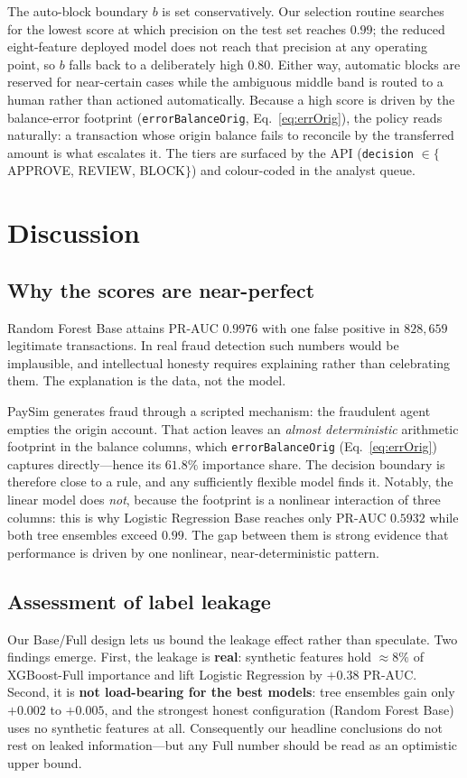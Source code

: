 \documentclass{article}
\begin{document}
The auto-block boundary $b$ is set conservatively. Our selection routine searches
for the lowest score at which precision on the test set reaches $0.99$; the
reduced eight-feature deployed model does not reach that precision at any operating
point, so $b$ falls back to a deliberately high $0.80$. Either way, automatic blocks
are reserved for near-certain cases while the ambiguous middle band is routed to a
human rather than actioned automatically. Because a high score is driven by the
balance-error footprint (\texttt{errorBalanceOrig},
Eq.~\ref{eq:errOrig}), the policy reads naturally: a transaction whose origin
balance fails to reconcile by the transferred amount is what escalates it. The
tiers are surfaced by the API
(\texttt{decision} $\in \{$APPROVE, REVIEW, BLOCK$\}$) and colour-coded in the
analyst queue.

\section{Discussion}
\label{sec:discussion}

\subsection{Why the scores are near-perfect}
Random Forest Base attains PR-AUC $0.9976$ with one false positive in
$828{,}659$ legitimate transactions. In real fraud detection such
numbers would be implausible, and intellectual honesty requires
explaining rather than celebrating them. The explanation is the data,
not the model.

PaySim generates fraud through a scripted mechanism: the fraudulent
agent empties the origin account. That action leaves an
\emph{almost deterministic} arithmetic footprint in the balance
columns, which \texttt{errorBalanceOrig} (Eq.~\ref{eq:errOrig})
captures directly---hence its $61.8\%$ importance share. The decision
boundary is therefore close to a rule, and any sufficiently flexible
model finds it. Notably, the linear model does \emph{not}, because the
footprint is a nonlinear interaction of three columns: this is why
Logistic Regression Base reaches only PR-AUC $0.5932$ while both tree
ensembles exceed $0.99$. The gap between them is strong evidence that
performance is driven by one nonlinear, near-deterministic pattern.

\subsection{Assessment of label leakage}
Our Base/Full design lets us bound the leakage effect rather than
speculate. Two findings emerge. First, the leakage is \textbf{real}:
synthetic features hold $\approx 8\%$ of XGBoost-Full importance and
lift Logistic Regression by $+0.38$ PR-AUC. Second, it is
\textbf{not load-bearing for the best models}: tree ensembles gain only
$+0.002$ to $+0.005$, and the strongest honest configuration (Random
Forest Base) uses no synthetic features at all. Consequently our
headline conclusions do not rest on leaked information---but any Full
number should be read as an optimistic upper bound.
\end{document}
